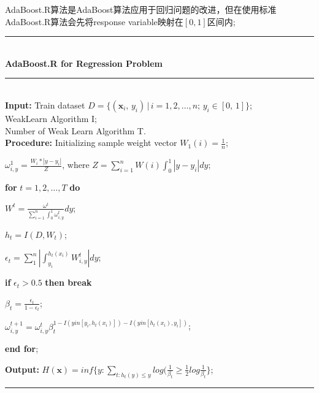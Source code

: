 \documentclass[a4paper]{article}
\begin{document}
			AdaBoost.R算法是AdaBoost算法应用于回归问题的改进，但在使用标准AdaBoost.R算法会先将response variable映射在$[0,1]区间内$;\par
			\noindent\rule[0.1\baselineskip]{\textwidth}{0.75pt}\\
			\textbf{AdaBoost.R for Regression Problem}\\
			\noindent\rule[0.1\baselineskip]{\textwidth}{0.5pt}\\
			\textbf{Input:} Train dataset $D = \{(\textbf{x}_i,\,y_i)\,|\,i = 1, 2,\dots, n;\, y_i \in [0,\,1]\}$;\\
			\hspace*{32pt} WeakLearn Algorithm I;\\
			\hspace*{32pt} Number of Weak Learn Algorithm T.\\
			\textbf{Procedure:} 
					\hspace*{2pt} Initializing sample weight vector $W_1(i) = \frac{1}{n}$;\par
					\hspace*{36pt}$\omega_{i,y}^1 = \frac{W_i*|y-y_i|}{Z}$, where $Z = \sum_{i=1}^{n}W(i)\int_{0}^{1}|y-y_i|dy$; \par
					\hspace*{32pt} \textbf{for} $t = 1, 2,\dots, T$ \textbf{do}\par
							\hspace*{48pt} $W^t = \frac{\omega^t}{\sum_{i=1}^{n}\int_{0}^{1}\omega_{i,y}^t}dy$;\par
							\hspace*{48pt} $h_t = I(D, W_t)$;\par
							\hspace*{48pt} $\epsilon_t = \sum_{1}^{n}|\int_{y_i}^{h_t(x_i)}W_{i,y}^{t}|dy$;\par
							\hspace*{48pt} \textbf{if} $\epsilon_t > 0.5$ \textbf{then break}\par
							\hspace*{48pt} $\beta_t = \frac{\epsilon_t}{1-\epsilon_t}$;\par
							\hspace*{48pt} $\omega_{i,y}^{t+1} = \omega_{i,y}^{t}\beta_t^{1-I(y in [y_i, h_t(x_i)])-I(y in [h_t(x_i),y_i])} $;\par
					\hspace*{32pt}\textbf{end for};\par
			\textbf{Output:} $H(\textbf{x}) = inf \{y:\sum_{t:h_t(y)\leq y}log(\frac{1}{\beta_t}\geq \frac{1}{2}log\frac{1}{\beta_t}\}$;\par
			\noindent\rule[0.1\baselineskip]{\textwidth}{0.75pt}
\end{document}
